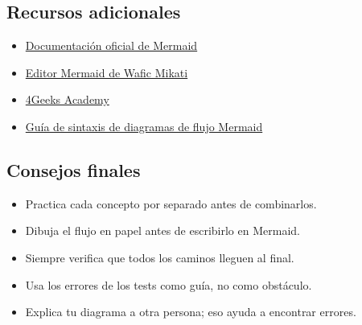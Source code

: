 \documentclass[12pt]{article}
\begin{document}
\subsection{Recursos adicionales}

\begin{itemize}
    \item \href{https://mermaid.js.org/}{Documentación oficial de Mermaid}
    \item \href{https://waficmikati.github.io/mermaid/}{Editor Mermaid de Wafic Mikati}
    \item \href{https://4geeks.com/}{4Geeks Academy}
    \item \href{https://mermaid.ai/open-source/syntax/flowchart.html}{Guía de sintaxis de diagramas de flujo Mermaid}
\end{itemize}

\subsection{Consejos finales}

\begin{itemize}
    \item Practica cada concepto por separado antes de combinarlos.
    \item Dibuja el flujo en papel antes de escribirlo en Mermaid.
    \item Siempre verifica que todos los caminos lleguen al final.
    \item Usa los errores de los tests como guía, no como obstáculo.
    \item Explica tu diagrama a otra persona; eso ayuda a encontrar errores.
\end{itemize}
\end{document}
